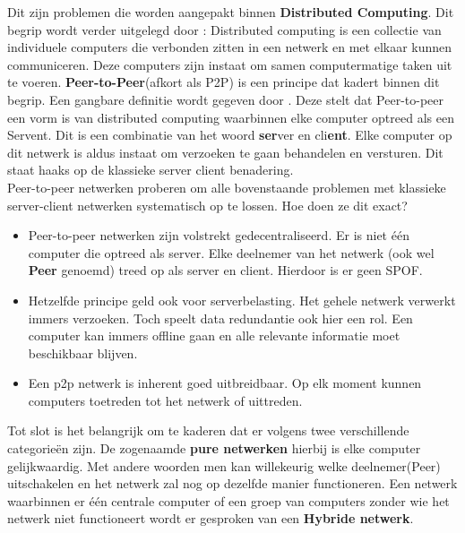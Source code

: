 Dit zijn problemen die worden aangepakt binnen \textbf{Distributed Computing}. Dit begrip wordt verder uitgelegd door \textcite{Attiya2004}: Distributed computing is een collectie van individuele computers die verbonden zitten in een netwerk en met elkaar kunnen communiceren. Deze computers zijn instaat om samen computermatige taken uit te voeren. \textbf{Peer-to-Peer}(afkort als P2P) is een principe dat kadert binnen dit begrip. Een gangbare definitie wordt gegeven door \textcite{Schollmeier2001}. Deze stelt dat Peer-to-peer een vorm is van distributed computing waarbinnen elke computer optreed als een Servent. Dit is een combinatie van het woord \textbf{ser}ver en cli\textbf{ent}. Elke computer op dit netwerk is aldus instaat om verzoeken te gaan behandelen en versturen. Dit staat haaks op de klassieke server client benadering. \\

Peer-to-peer netwerken proberen om alle bovenstaande problemen met klassieke server-client netwerken systematisch op te lossen. Hoe doen ze dit exact?

\begin{itemize}
	\item Peer-to-peer netwerken zijn volstrekt gedecentraliseerd. Er is niet één computer die optreed als server. Elke deelnemer van het netwerk (ook wel \textbf{Peer} genoemd) treed op als server en client. Hierdoor is er geen SPOF.\\
	\item Hetzelfde principe geld ook voor serverbelasting. Het gehele netwerk verwerkt immers verzoeken. Toch speelt data redundantie ook hier een rol. Een computer kan immers offline gaan en alle relevante informatie moet beschikbaar blijven.\\
	\item Een p2p netwerk is inherent goed uitbreidbaar. Op elk moment kunnen computers toetreden tot het netwerk of uittreden.
\end{itemize}

Tot slot is het belangrijk om te kaderen dat er volgens \textcite{Schollmeier2001} twee verschillende categorieën zijn. De zogenaamde \textbf{pure netwerken} hierbij is elke computer gelijkwaardig. Met andere woorden men kan willekeurig welke deelnemer(Peer) uitschakelen en het netwerk zal nog op dezelfde manier functioneren. Een netwerk waarbinnen er één centrale computer of een groep van computers zonder wie het netwerk niet functioneert wordt er gesproken van een \textbf{Hybride netwerk}.\\


